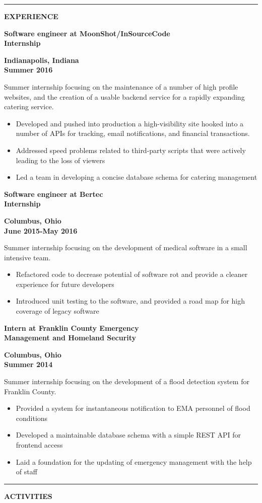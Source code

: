 \documentclass[letterpaper,10pt]{article}
\newcommand{\topic}[1]{\vspace{2mm} \rule[.5em]{10mm}{.2pt} {\large \bfseries #1} \xrfill[.5em]{.2pt} \newline \vspace{-2mm}}
\newcommand{\fullentry}[3] { \parbox[t]{.6\textwidth}{\large \bfseries #1} \hfill \parbox[t]{.4\textwidth}{\bfseries \raggedleft #2 \\ #3} \vspace{.5mm} \newline}
\begin{document}
	\topic{EXPERIENCE}

		\fullentry{Software engineer at MoonShot/InSourceCode \\ Internship}{Indianapolis, Indiana}{Summer 2016}
			Summer internship focusing on the maintenance of a number of high profile websites, and the creation of a usable backend service for a rapidly expanding catering service.
			\begin{itemize}
				\item Developed and pushed into production a high-visibility site hooked into a number of APIs for tracking, email notifications, and financial transactions.
				\item Addressed speed problems related to third-party scripts that were actively leading to the loss of viewers
				\item Led a team in developing a concise database schema for catering management
			\end{itemize}

		\fullentry{Software engineer at Bertec \\ Internship}{Columbus, Ohio}{June 2015-May 2016}
			Summer internship focusing on the development of medical software in a small intensive team.
			\begin{itemize}
				\item Refactored code to decrease potential of software rot and provide a cleaner experience for future developers
				\item Introduced unit testing to the software, and provided a road map for high coverage of legacy software
			\end{itemize}
	
		\fullentry{Intern at Franklin County Emergency\\ Management and Homeland Security}{Columbus, Ohio}{Summer 2014}
			Summer internship focusing on the development of a flood detection system for Franklin County.
			\begin{itemize}
				\item Provided a system for instantaneous notification to EMA personnel of flood conditions
				\item Developed a maintainable database schema with a simple REST API for frontend access
				\item Laid a foundation for the updating of emergency management with the help of staff
			\end{itemize}

	\topic{ACTIVITIES}
\end{document}
